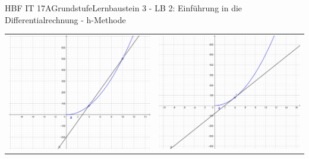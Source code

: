\documentclass[oneside,openany,headings=optiontotoc,11pt,numbers=noenddot]{scrreprt}
\begin{document}
	\begin{worksheet}{HBF IT 17A}{Grundstufe}{Lernbaustein 3 - LB 2: Einführung in die Differentialrechnung - h-Methode}
		
		\noindent
		\begin{framed}
			\begin{center}
				\begin{tabularx}{\textwidth}{X|X}
					\includegraphics[scale=0.25]{Bilder/Differenzenquotient.jpg} & \includegraphics[scale=0.25]{Bilder/Differentialquotient.jpg}
				\end{tabularx}
			\end{center}
		\end{framed}
	

\end{worksheet}
\end{document}
